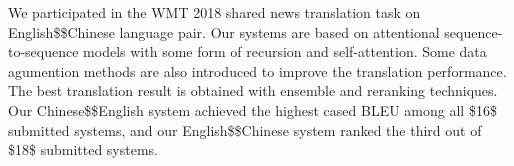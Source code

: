 We participated in the WMT 2018 shared news translation task on English\$\leftrightarrow\$Chinese language pair.  Our systems are based on attentional sequence-to-sequence models with some form of recursion and self-attention. Some data agumention methods are also introduced to improve the translation performance. The best translation result is obtained with ensemble and reranking techniques. Our Chinese\$\rightarrow\$English system achieved the highest cased BLEU among all \$16\$ submitted systems, and our English\$\leftarrow\$Chinese system ranked the third out of \$18\$ submitted systems.
